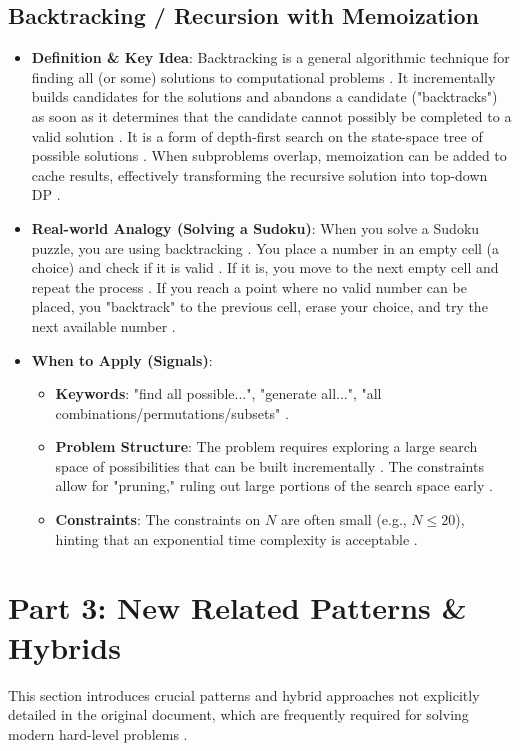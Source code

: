 \documentclass{article}
\begin{document}
\subsection{Backtracking / Recursion with Memoization}
\begin{itemize}
\item \textbf{Definition \& Key Idea}: Backtracking is a general algorithmic technique for finding all (or some) solutions to computational problems \cite{976}. It incrementally builds candidates for the solutions and abandons a candidate ("backtracks") as soon as it determines that the candidate cannot possibly be completed to a valid solution \cite{977}. It is a form of depth-first search on the state-space tree of possible solutions \cite{978}. When subproblems overlap, memoization can be added to cache results, effectively transforming the recursive solution into top-down DP \cite{979}.
\item \textbf{Real-world Analogy (Solving a Sudoku)}: When you solve a Sudoku puzzle, you are using backtracking \cite{980}. You place a number in an empty cell (a choice) and check if it is valid \cite{981, 982}. If it is, you move to the next empty cell and repeat the process \cite{983}. If you reach a point where no valid number can be placed, you "backtrack" to the previous cell, erase your choice, and try the next available number \cite{985}.
\item \textbf{When to Apply (Signals)}:
\begin{itemize}
\item \textbf{Keywords}: "find all possible...", "generate all...", "all combinations/permutations/subsets" \cite{989}.
\item \textbf{Problem Structure}: The problem requires exploring a large search space of possibilities that can be built incrementally \cite{990}. The constraints allow for "pruning," ruling out large portions of the search space early \cite{991}.
\item \textbf{Constraints}: The constraints on $N$ are often small (e.g., $N\le20$), hinting that an exponential time complexity is acceptable \cite{992}.
\end{itemize}
\end{itemize}

\section{Part 3: New Related Patterns \& Hybrids}
This section introduces crucial patterns and hybrid approaches not explicitly detailed in the original document, which are frequently required for solving modern hard-level problems \cite{1039}.
\end{document}
